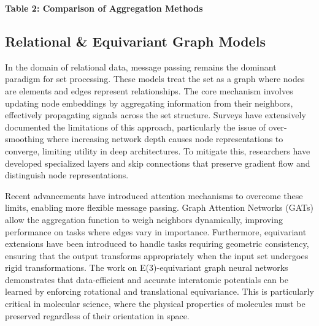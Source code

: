\documentclass{article}
\begin{document}
\textbf{Table 2: Comparison of Aggregation Methods}

\begin{table}[ht]
\centering
\caption{Performance comparison of different methods on Key Idea, Dataset/Benchmark, Performance, Limitations}
\label{tab:2}
\end{table}

\subsection{Relational \& Equivariant Graph Models}

\label{sec:relational_equivariant_graph_models}

In the domain of relational data, message passing remains the dominant paradigm for set processing. These models treat the set as a graph where nodes are elements and edges represent relationships. The core mechanism involves updating node embeddings by aggregating information from their neighbors, effectively propagating signals across the set structure. Surveys have extensively documented the limitations of this approach, particularly the issue of over-smoothing where increasing network depth causes node representations to converge, limiting utility in deep architectures. To mitigate this, researchers have developed specialized layers and skip connections that preserve gradient flow and distinguish node representations.

Recent advancements have introduced attention mechanisms to overcome these limits, enabling more flexible message passing. Graph Attention Networks (GATs) allow the aggregation function to weigh neighbors dynamically, improving performance on tasks where edges vary in importance. Furthermore, equivariant extensions have been introduced to handle tasks requiring geometric consistency, ensuring that the output transforms appropriately when the input set undergoes rigid transformations. The work on E(3)-equivariant graph neural networks demonstrates that data-efficient and accurate interatomic potentials can be learned by enforcing rotational and translational equivariance. This is particularly critical in molecular science, where the physical properties of molecules must be preserved regardless of their orientation in space.
\end{document}
